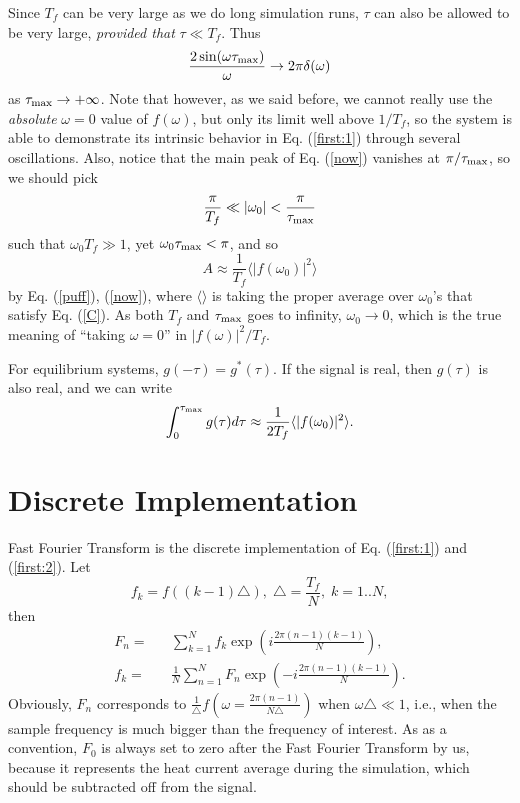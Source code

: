 Since $T_{f}$ can be very large as we do long simulation runs, $\tau$ can
also be allowed to be very large, {\em provided that} $\tau \ll T_{f}$.
Thus
\begin{equation} 
\frac{2\sin(\omega \tau_{\rm max})}{\omega} \rightarrow 
2\pi \rm{\delta}(\omega)
\label{now} \end{equation} 
as $\tau_{\rm max} \rightarrow +\infty$. Note that however, as we said
before, we cannot really use the {\em absolute} $\omega=0$ value of
$f(\omega)$, but only its limit well above $1/T_{f}$, so the system is
able to demonstrate its intrinsic behavior in Eq. (\ref{first:1})
through several oscillations.  Also, notice that the main peak of Eq.
(\ref{now}) vanishes at $\pi /\tau_{\rm max}$, so we should pick
\begin{equation}  
\frac{\pi}{T_{f}} \ll 
|\omega_0|  <
\frac{\pi}{\tau_{\rm max}} \label{C} 
\end{equation}
such that $\omega_0T_{f}\gg 1$, yet $\omega_0 \tau_{\rm max} < \pi$,
and so
\begin{equation} A \approx \frac{1}{T_{f}} \langle |f(\omega_0)|^2 \rangle
\end{equation}
by Eq. (\ref{puff}), (\ref{now}), where $\langle \rangle$ is taking
the proper average over $\omega_0$'s that satisfy Eq. (\ref{C}).  As
both $T_{f}$ and $\tau_{\rm max}$ goes to infinity, $\omega_0
\rightarrow 0$, which is the true meaning of ``taking $\omega=0$'' in
$|f(\omega)|^2/T_{f}$.

For equilibrium systems, $g(-\tau)= g^*(\tau)$. If the signal is
real, then $g(\tau)$ is also real, and we can write
\begin{equation} 
\int^{\tau_{\rm max}}_{0} g(\tau) d\tau 
\approx \frac{1}{2T_{f}} \langle |f(\omega_0)|^2 \rangle. 
\end{equation}

\section{Discrete Implementation}
\label{sec:discrete}

Fast Fourier Transform is the discrete implementation of Eq.
(\ref{first:1}) and (\ref{first:2}).  Let
\begin{equation} 
f_k = f\left( (k-1) \triangle\right), \; \triangle = \frac{T_{f}}{N}, \;  k=1..N,
\end{equation}
then 
\begin{eqnarray}
F_n =&& \sum^{N}_{k=1} f_k 
\exp\left(i\frac{2\pi (n-1)(k-1)}{N} \right ), \nonumber\\
f_k =&& \frac{1}{N} \sum^{N}_{n=1} F_n 
\exp\left(-i\frac{2\pi (n-1)(k-1)}{N}\right).
\end{eqnarray}
Obviously, $F_n$ corresponds to $\frac{1}{\triangle}f\left(\omega =
  \frac{2\pi (n-1)}{N\triangle}\right)$ when $\omega \triangle \ll 1$,
i.e., when the sample frequency is much bigger than the frequency of
interest. As as a convention, $F_0$ is always set to zero after the
Fast Fourier Transform by us, because it represents the heat current
average during the simulation, which should be subtracted off from the
signal.

